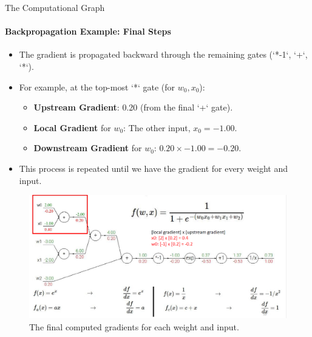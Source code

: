\begin{frame}{The Computational Graph}
    \framesubtitle{Backpropagation Example: Final Steps}
    \small
    \begin{itemize}
        \item The gradient is propagated backward through the remaining gates (`*-1`, `+`, `*`).
        \item For example, at the top-most `*` gate (for $w_0, x_0$):
        \begin{itemize}
            \item \textbf{Upstream Gradient}: 0.20 (from the final `+` gate).
            \item \textbf{Local Gradient} for $w_0$: The other input, $x_0 = -1.00$.
            \item \textbf{Downstream Gradient} for $w_0$: $0.20 \times -1.00 = -0.20$.
        \end{itemize}
        \item This process is repeated until we have the gradient for every weight and input.
    \end{itemize}
    \begin{figure}
        \centering
        \includegraphics[width=0.8\linewidth]{images/sigmoid_backprop_final.png}
        \caption{The final computed gradients for each weight and input.}
    \end{figure}
\end{frame}